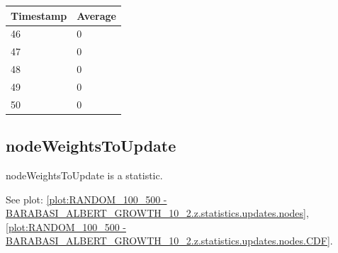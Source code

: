 \begin{tabular}{|l||l|}
\hline
	\textbf{Timestamp} & \textbf{Average} \\ \hline
	46 & 0 \\ \hline
	47 & 0 \\ \hline
	48 & 0 \\ \hline
	49 & 0 \\ \hline
	50 & 0 \\ \hline
\end{tabular}

\subsection{nodeWeightsToUpdate}
nodeWeightsToUpdate is a statistic.

See plot: \ref{plot:RANDOM_100_500 - BARABASI_ALBERT_GROWTH_10_2.z.statistics.updates.nodes}, \ref{plot:RANDOM_100_500 - BARABASI_ALBERT_GROWTH_10_2.z.statistics.updates.nodes.CDF}.

